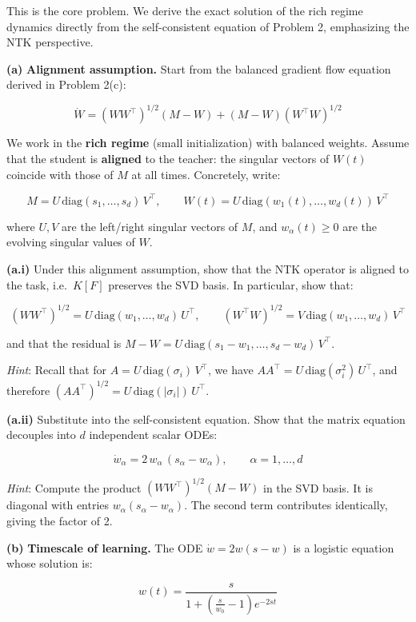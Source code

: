 \documentclass[
]{article}
\begin{document}
This is the core problem. We derive the exact solution of the rich
regime dynamics directly from the self-consistent equation of Problem 2,
emphasizing the NTK perspective.

\textbf{(a)} \textbf{Alignment assumption.} Start from the balanced
gradient flow equation derived in Problem 2(c):

\[\dot{W} = (WW^\top)^{1/2}(M - W) + (M - W)(W^\top W)^{1/2}\]

We work in the \textbf{rich regime} (small initialization) with balanced
weights. Assume that the student is \textbf{aligned} to the teacher: the
singular vectors of \(W(t)\) coincide with those of \(M\) at all times.
Concretely, write:

\[M = U\,\text{diag}(s_1, \ldots, s_d)\,V^\top, \qquad W(t) = U\,\text{diag}(w_1(t), \ldots, w_d(t))\,V^\top\]

where \(U, V\) are the left/right singular vectors of \(M\), and
\(w_\alpha(t) \geq 0\) are the evolving singular values of \(W\).

\textbf{(a.i)} Under this alignment assumption, show that the NTK
operator is aligned to the task, i.e.~\(K[F]\) preserves the SVD basis.
In particular, show that:

\[(WW^\top)^{1/2} = U\,\text{diag}(w_1, \ldots, w_d)\,U^\top, \qquad (W^\top W)^{1/2} = V\,\text{diag}(w_1, \ldots, w_d)\,V^\top\]

and that the residual is
\(M - W = U\,\text{diag}(s_1 - w_1, \ldots, s_d - w_d)\,V^\top\).

\emph{Hint}: Recall that for \(A = U\,\text{diag}(\sigma_i)\,V^\top\),
we have \(AA^\top = U\,\text{diag}(\sigma_i^2)\,U^\top\), and therefore
\((AA^\top)^{1/2} = U\,\text{diag}(|\sigma_i|)\,U^\top\).

\textbf{(a.ii)} Substitute into the self-consistent equation. Show that
the matrix equation decouples into \(d\) independent scalar ODEs:

\[\dot{w}_\alpha = 2\,w_\alpha\,(s_\alpha - w_\alpha), \qquad \alpha = 1, \ldots, d\]

\emph{Hint}: Compute the product \((WW^\top)^{1/2}(M - W)\) in the SVD
basis. It is diagonal with entries \(w_\alpha(s_\alpha - w_\alpha)\).
The second term contributes identically, giving the factor of 2.

\textbf{(b)} \textbf{Timescale of learning.} The ODE
\(\dot{w} = 2w(s - w)\) is a logistic equation whose solution is:

\[w(t) = \frac{s}{1 + \left(\frac{s}{w_0} - 1\right)e^{-2st}}\]
\end{document}
